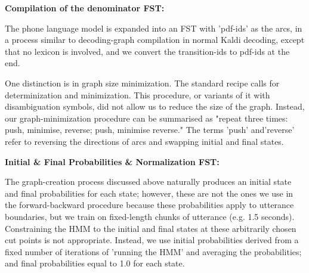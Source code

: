
\textbf{Compilation of the denominator FST:} 

The phone language model is expanded into an FST with 'pdf-ids' as the arcs, in a process similar to decoding-graph compilation in normal Kaldi decoding, except that no lexicon is involved, and we convert the transition-ids to pdf-ids at the end.

One distinction is in graph size minimization. The standard recipe calls for determinization and minimization. This procedure, or variants of it with disambiguation symbols, did not allow us to reduce the size of the graph. Instead, our graph-minimization procedure can be summarised as "repeat three times: push, minimise, reverse; push, minimise reverse." The terms 'push' and'reverse' refer to reversing the directions of arcs and swapping initial and final states.

\textbf{Initial \& Final Probabilities \& Normalization FST:}

The graph-creation process discussed above naturally produces an initial state and final probabilities for each state; however, these are not the ones we use in the forward-backward procedure because these probabilities apply to utterance boundaries, but we train on fixed-length chunks of utterance (e.g. 1.5 seconds). Constraining the HMM to the initial and final states at these arbitrarily chosen cut points is not appropriate. Instead, we use initial probabilities derived from a fixed number of iterations of 'running the HMM' and averaging the probabilities; and final probabilities equal to 1.0 for each state.


